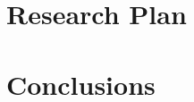 \documentclass[10pt,sigconf]{acmart}
\begin{document}


\section{Research Plan}


\section{Conclusions}


%
\end{document}
